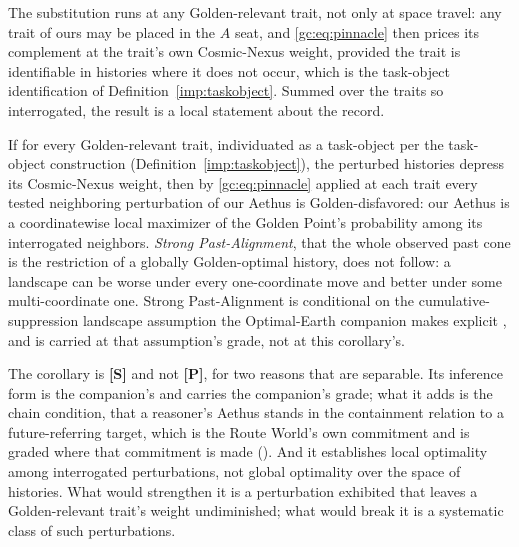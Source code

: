 The substitution runs at any Golden-relevant trait, not only at space
travel: any trait of ours may be placed in the $A$ seat, and
\eqref{gc:eq:pinnacle} then prices its complement at the trait's own
Cosmic-Nexus weight, provided the trait is identifiable in histories
where it does not occur, which is the task-object identification of
Definition~\ref{imp:taskobject}. Summed over the traits so interrogated, the
result is a local statement about the record.

\begin{corollary}
\label{gc:cor:localopt}
If for every Golden-relevant trait, individuated as a task-object per
the task-object construction (Definition~\ref{imp:taskobject}), the perturbed histories depress its Cosmic-Nexus
weight, then by \eqref{gc:eq:pinnacle} applied at each trait every
tested neighboring perturbation of our Aethus is Golden-disfavored:
our Aethus is a coordinatewise local maximizer of the Golden Point's
probability among its interrogated neighbors. \emph{Strong
Past-Alignment}, that the whole observed past cone is the restriction
of a globally Golden-optimal history, does not follow: a landscape can
be worse under every one-coordinate move and better under some
multi-coordinate one. Strong Past-Alignment is conditional on the
cumulative-suppression landscape assumption the Optimal-Earth companion
makes explicit \cite{AethusOptimalEarth}, and is carried at that assumption's
grade, not at this corollary's.
\end{corollary}

\begin{remark}\label{gc:rem:grade}
The corollary is \textbf{[S]} and not \textbf{[P]}, for two reasons
that are separable. Its inference form is the companion's and carries
the companion's grade; what it adds is the chain condition, that a
reasoner's Aethus stands in the containment relation to a
future-referring target, which is the Route World's own commitment
and is graded where that commitment is made
(\cite{GoldenTargeted}). And it establishes local optimality
among interrogated perturbations, not global optimality over the
space of histories. What would strengthen it is a perturbation
exhibited that leaves a Golden-relevant trait's weight undiminished;
what would break it is a systematic class of such perturbations.
\end{remark}

